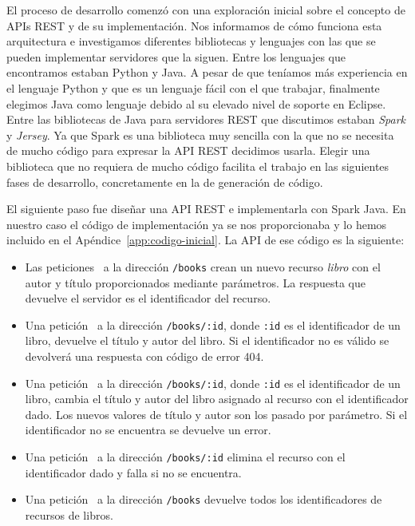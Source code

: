 \documentclass[runningheads]{llncs}
\begin{document}
El proceso de desarrollo comenzó con una exploración inicial sobre
el concepto de APIs REST y de su implementación. Nos informamos de
cómo funciona esta arquitectura e investigamos diferentes bibliotecas
y lenguajes con las que se pueden implementar servidores que la siguen.
Entre los lenguajes que encontramos estaban Python y Java. A pesar de que
teníamos más experiencia en el lenguaje Python y que es un lenguaje
fácil con el que trabajar, finalmente elegimos Java como lenguaje
debido al su elevado nivel de soporte en Eclipse. Entre las bibliotecas
de Java para servidores REST que discutimos estaban \emph{Spark} y
\emph{Jersey}. Ya que Spark es una biblioteca muy sencilla con la que
no se necesita de mucho código para expresar la API REST decidimos
usarla. Elegir una biblioteca que no requiera de mucho código facilita
el trabajo en las siguientes fases de desarrollo, concretamente en la
de generación de código.

El siguiente paso fue diseñar una API REST e implementarla con
Spark Java. En nuestro caso el código de implementación
ya se nos proporcionaba y lo hemos incluido en el
Apéndice~\ref{app:codigo-inicial}. La API de ese código es la siguiente:

\begin{itemize}
    \item Las peticiones \POST\ a la dirección
        \texttt{/books} crean un nuevo recurso \emph{libro} con el autor
        y título proporcionados mediante parámetros. La respuesta
        que devuelve el servidor es el identificador del recurso.
    \item Una petición \GET\ a la dirección \texttt{/books/:id}, donde
        \texttt{:id} es el identificador de un libro, devuelve el título
        y autor del libro. Si el identificador no es válido se devolverá
        una respuesta con código de error 404.
    \item Una petición \PUT\ a la dirección \texttt{/books/:id}, donde
        \texttt{:id} es el identificador de un libro, cambia el título
        y autor del libro asignado al recurso con el identificador dado. Los
        nuevos valores de título y autor son los pasado por parámetro. Si
        el identificador no se encuentra se devuelve un error.
    \item Una petición \DELETE\ a la dirección \texttt{/books/:id}
        elimina el recurso con el identificador dado y falla si no
        se encuentra.
    \item Una petición \GET\ a la dirección \texttt{/books} devuelve todos
        los identificadores de recursos de libros.
\end{itemize}
\end{document}
